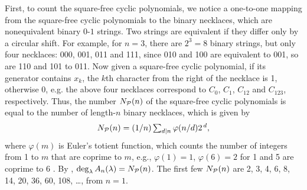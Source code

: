 \documentclass{ws-ijbc}
\begin{document}

First, to count the square-free cyclic polynomials,
  we notice a one-to-one mapping
  from the square-free cyclic polynomials
  to the binary necklaces,
%
which are nonequivalent binary $0$-$1$ strings.
%
Two strings are equivalent if they differ only by a circular shift.
%
For example, for $n = 3$, there are $2^3 = 8$ binary strings,
but only four necklaces: 000, 001, 011 and 111,
since 010 and 100 are equivalent to 001,
so are 110 and 101 to 011.
%
%
Now given a square-free cyclic polynomial, if its generator contains $x_k$,
  the $k$th character from the right of the necklace is 1,
  otherwise 0,
e.g. the above four necklaces correspond to
  $C_0$, $C_1$, $C_{12}$ and $C_{123}$, respectively.
Thus,
%
the number $N_\mathcal P(n)$ of the square-free cyclic polynomials
  is equal to the number of length-$n$ binary necklaces,
  which is given by \cite{riordan}
\begin{equation}
  N_\mathcal P(n) = (1/n) \textstyle\sum_{d|n} \varphi(n/d) 2^{\,d},
\label{eq:necklace}
\end{equation}
%
%
where $\varphi(m)$ is Euler's totient function,
  which counts the number of integers from 1 to $m$
  that are coprime to $m$,
  e.g.,
  $\varphi(1) = 1$,
  $\varphi(6) = 2$ for 1 and 5 are coprime to 6 \cite{hardy}.
%
By ,
  $\deg_\lambda A_n(\lambda) = N_\mathcal P(n)$.
The first few $N_\mathcal P(n)$ are
2, 3, 4, 6, 8, 14, 20, 36, 60, 108, \dots, %
  from $n = 1$.



\end{document}

